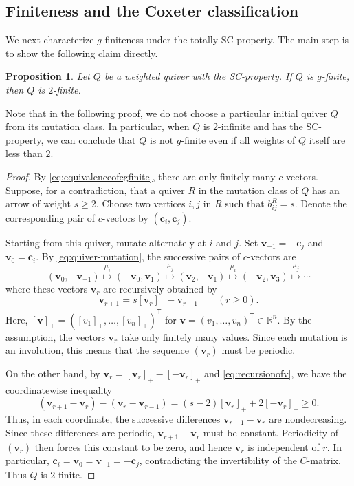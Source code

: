 \documentclass[11pt,reqno]{amsart}
\numberwithin{equation}{section}
\theoremstyle{definition}
\theoremstyle{plain}
\newtheorem{proposition}[example]{Proposition}
\begin{document}
\subsection{Finiteness and the Coxeter classification}	
	We next characterize $g$-finiteness under the totally SC-property. The main step is to show the following claim directly.
  \begin{proposition}\label{prop:cfiniteto2finite}
    Let $Q$ be a weighted quiver with the SC-property. If $Q$ is $g$-finite, then $Q$ is $2$-finite.
  \end{proposition}
  Note that in the following proof, we do not choose a particular initial quiver $Q$ from its mutation class. In particular, when $Q$ is $2$-infinite and has the SC-property, we can conclude that $Q$ is not $g$-finite even if all weights of $Q$ itself are less than $2$.
  \begin{proof}
    By \eqref{eq:equivalenceofcgfinite}, there are only finitely many $c$-vectors.
    Suppose, for a contradiction, that a quiver $R$ in the mutation class of $Q$ has an arrow of weight $s \geq 2$.  Choose two vertices $i,j$ in $R$ such that $b_{ij}^R = s$. Denote the corresponding pair of $c$-vectors by $(\mathbf c_i,\mathbf c_j)$.
		
		Starting from this quiver, mutate alternately at $i$ and $j$. Set $\mathbf v_{-1}=-\mathbf c_j$ and $\mathbf v_0=\mathbf c_i$. By \eqref{eq:quiver-mutation}, the successive pairs of $c$-vectors are
    \[
		(\mathbf v_0,-\mathbf v_{-1}) \overset{\mu_i}{\mapsto}
		(-\mathbf v_0,\mathbf v_1) \overset{\mu_j}{\mapsto}
		(\mathbf v_2,-\mathbf v_1) \overset{\mu_i}{\mapsto}
		(-\mathbf v_2,\mathbf v_3) \overset{\mu_j}{\mapsto} \cdots
		\]
    where these vectors $\mathbf{v}_r$ are recursively obtained by
		\begin{equation}\label{eq:recursionofv}
		  \mathbf v_{r+1}=s[\mathbf v_r]_+-\mathbf v_{r-1}
		  \qquad(r\geq0).
    \end{equation}
		Here, $[\mathbf v]_+ = ([v_1]_{+},\dots,[v_n]_{+})^{\mathsf T}$ for $\mathbf{v}=(v_1,\dots,v_n)^{\mathsf T} \in \mathbb{R}^n$. 
    By the assumption, the vectors $\mathbf{v}_r$ take only finitely many values. Since each mutation is an involution, this means that the sequence $(\mathbf{v}_r)$ must be periodic.

		On the other hand, by $\mathbf{v}_r = [\mathbf{v}_r]_{+} - [-\mathbf{v}_r]_{+}$ and \eqref{eq:recursionofv}, we have the coordinatewise inequality
		\[
		(\mathbf{v}_{r+1}-\mathbf{v}_r)-(\mathbf{v}_r-\mathbf{v}_{r-1})
		=(s-2)[\mathbf v_r]_++2[-\mathbf v_r]_+
		\geq 0.
		\]
		Thus, in each coordinate, the successive differences $\mathbf{v}_{r+1}-\mathbf{v}_{r}$ are nondecreasing. Since these differences are periodic, $\mathbf{v}_{r+1} - \mathbf{v}_r$ must be constant. Periodicity of $(\mathbf v_r)$ then forces this constant to be zero, and hence $\mathbf{v}_r$ is independent of $r$. In particular, $\mathbf c_i=\mathbf v_0=\mathbf v_{-1}=-\mathbf c_j$, contradicting the invertibility of the $C$-matrix. Thus $Q$ is $2$-finite.
  \end{proof}
\end{document}
